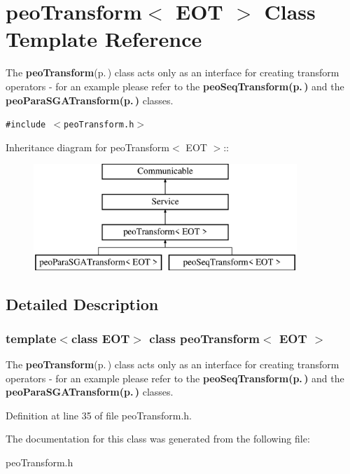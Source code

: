 \section{peo\-Transform$<$ EOT $>$ Class Template Reference}
\label{classpeo_transform}
The {\bf peo\-Transform}{\rm (p.\,\pageref{classpeo_transform})} class acts only as an interface for creating transform operators - for an example please refer to the {\bf {\bf peo\-Seq\-Transform}{\rm (p.\,\pageref{classpeo_seq_transform})}} and the {\bf {\bf peo\-Para\-SGATransform}{\rm (p.\,\pageref{classpeo_para_s_g_a_transform})}} classes.  


{\tt \#include $<$peo\-Transform.h$>$}

Inheritance diagram for peo\-Transform$<$ EOT $>$::\begin{figure}[H]
\begin{center}
\leavevmode
\includegraphics[height=4cm]{classpeo_transform}
\end{center}
\end{figure}


\subsection{Detailed Description}
\subsubsection*{template$<$class EOT$>$ class peo\-Transform$<$ EOT $>$}

The {\bf peo\-Transform}{\rm (p.\,\pageref{classpeo_transform})} class acts only as an interface for creating transform operators - for an example please refer to the {\bf {\bf peo\-Seq\-Transform}{\rm (p.\,\pageref{classpeo_seq_transform})}} and the {\bf {\bf peo\-Para\-SGATransform}{\rm (p.\,\pageref{classpeo_para_s_g_a_transform})}} classes. 



Definition at line 35 of file peo\-Transform.h.

The documentation for this class was generated from the following file:\begin{CompactItemize}
\item 
peo\-Transform.h\end{CompactItemize}
